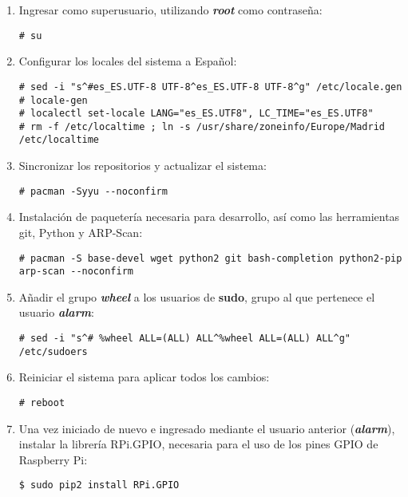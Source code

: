     \begin{enumerate}
        \item Ingresar como superusuario, utilizando \textbf{\textit{root}} como contraseña:
            \begin{verbatim}
# su
            \end{verbatim}
        \item Configurar los locales del sistema a Español:
            \begin{verbatim}
# sed -i "s^#es_ES.UTF-8 UTF-8^es_ES.UTF-8 UTF-8^g" /etc/locale.gen
# locale-gen
# localectl set-locale LANG="es_ES.UTF8", LC_TIME="es_ES.UTF8"
# rm -f /etc/localtime ; ln -s /usr/share/zoneinfo/Europe/Madrid /etc/localtime
            \end{verbatim}

        \item Sincronizar los repositorios y actualizar el sistema:
            \begin{verbatim}
# pacman -Syyu --noconfirm
            \end{verbatim}
        \item Instalación de paquetería necesaria para desarrollo, así como las herramientas git, Python y ARP-Scan:
            \begin{verbatim}
# pacman -S base-devel wget python2 git bash-completion python2-pip arp-scan --noconfirm
            \end{verbatim}
        \item Añadir el grupo \textbf{\textit{wheel}} a los usuarios de \textbf{sudo}, grupo al que pertenece el usuario \textbf{\textit{alarm}}:
            \begin{verbatim}
# sed -i "s^# %wheel ALL=(ALL) ALL^%wheel ALL=(ALL) ALL^g" /etc/sudoers
            \end{verbatim}
        \item Reiniciar el sistema para aplicar todos los cambios:
            \begin{verbatim}
# reboot
            \end{verbatim}
        \item Una vez iniciado de nuevo e ingresado mediante el usuario anterior (\textbf{\textit{alarm}}), instalar la librería RPi.GPIO, necesaria para el uso de los pines GPIO de Raspberry Pi:
            \begin{verbatim}
$ sudo pip2 install RPi.GPIO
            \end{verbatim}
    \end{enumerate}

